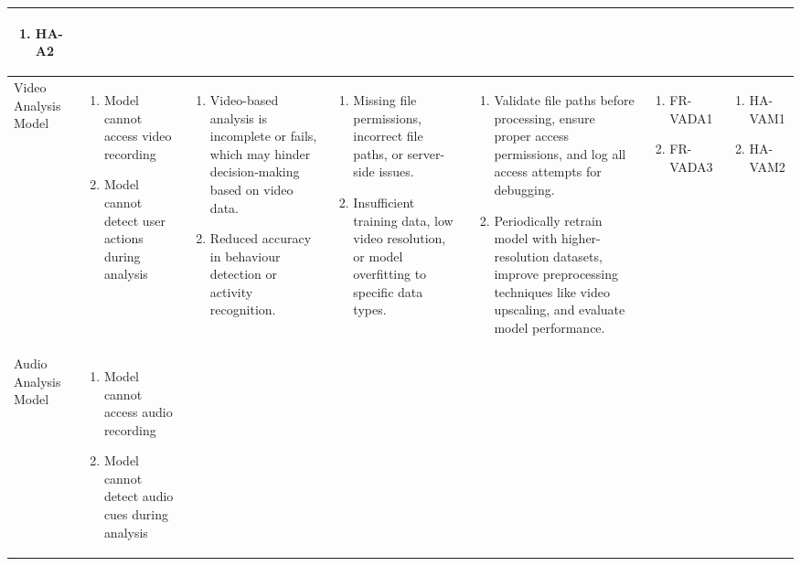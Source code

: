 \documentclass{article}
\begin{document}
\begin{landscape}
\begin{longtable}{|p{3cm}|p{3cm}|p{4cm}|p{4cm}|p{3cm}|p{2cm}|p{3cm}|}
\begin{enumerate}[leftmargin=*]
       \item HA-A2
  \end{enumerate} \\
  \hline
  Video Analysis Model & 
  \begin{enumerate}[leftmargin=*]
      \item Model cannot access video recording
      \item Model cannot detect user actions during analysis
  \end{enumerate} & 
  \begin{enumerate}[leftmargin=*]
      \item Video-based analysis is incomplete or fails, which may hinder decision-making based on video data.
      \item Reduced accuracy in behaviour detection or activity recognition.
  \end{enumerate} &
  \begin{enumerate}[leftmargin=*]
       \item Missing file permissions, incorrect file paths, or server-side issues.
       \item Insufficient training data, low video resolution, or model overfitting to specific data types.
  \end{enumerate} &
  \begin{enumerate}[leftmargin=*]
       \item Validate file paths before processing, ensure proper access permissions, and log all access attempts for debugging.
       \item Periodically retrain model with higher-resolution datasets, improve preprocessing techniques like video upscaling, and evaluate model performance.
  \end{enumerate} &
  \begin{enumerate}[leftmargin=*]
       \item FR-VADA1
       \item FR-VADA3
  \end{enumerate} &
  \begin{enumerate}[leftmargin=*]
       \item HA-VAM1
       \item HA-VAM2
  \end{enumerate} \\
  \hline
  Audio Analysis Model & 
  \begin{enumerate}[leftmargin=*]
      \item Model cannot access audio recording
      \item Model cannot detect audio cues during analysis

\end{enumerate}
\end{longtable}
\end{landscape}
\end{document}
